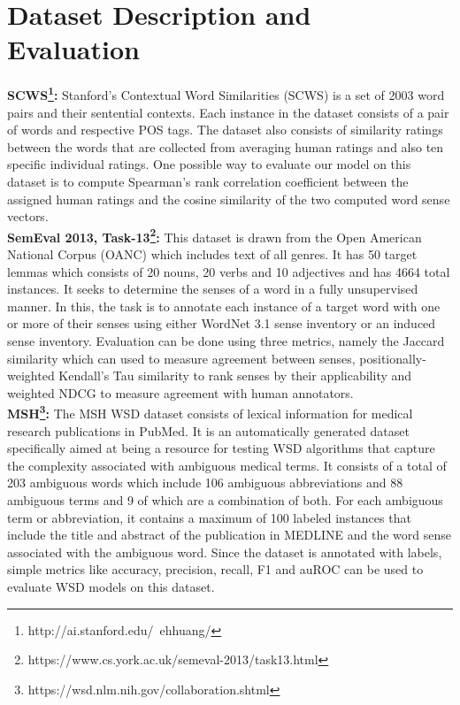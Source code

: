 \documentclass{article}
\begin{document}
\section{Dataset Description and Evaluation}
\textbf{SCWS\footnote{http://ai.stanford.edu/~ehhuang/}:} Stanford’s Contextual Word Similarities (SCWS) is a set of 2003 word pairs and their sentential contexts. Each instance in the dataset consists of a pair of words and respective POS tags. The dataset also consists of similarity ratings between the words that are collected from averaging human ratings and also ten specific individual ratings. One possible way to evaluate our model on this dataset is to compute Spearman’s rank correlation coefficient between the assigned human ratings and the cosine similarity of the two computed word sense vectors.\\

\textbf{SemEval 2013, Task-13\footnote{https://www.cs.york.ac.uk/semeval-2013/task13.html}:} This dataset is drawn from the Open American National Corpus (OANC) which includes text of all genres. It has 50 target lemmas which consists of 20 nouns, 20 verbs and 10 adjectives and has 4664 total instances. It seeks to determine the senses of a word in a fully unsupervised manner. In this, the task is to annotate each instance of a target word with one or more of their senses using either WordNet 3.1 sense inventory or an induced sense inventory. Evaluation can be done using three metrics, namely the Jaccard similarity which can used to measure agreement between senses, positionally-weighted Kendall’s Tau similarity to rank senses by their applicability and weighted NDCG to measure agreement with human annotators.\\


\textbf{MSH\footnote{https://wsd.nlm.nih.gov/collaboration.shtml}:} The MSH WSD dataset consists of lexical information for medical research publications in PubMed. It is an automatically generated dataset specifically aimed at being a resource for testing WSD algorithms that capture the complexity associated with ambiguous medical terms. It consists of a total of 203 ambiguous words which include 106 ambiguous abbreviations and 88 ambiguous terms and 9 of which are a combination of both. For each ambiguous term or abbreviation, it contains a maximum of 100 labeled instances that include the title and abstract of the publication in MEDLINE and the word sense associated with the ambiguous word. Since the dataset is annotated with labels, simple metrics like accuracy, precision, recall, F1 and auROC can be used to evaluate WSD models on this dataset.\\
\end{document}
